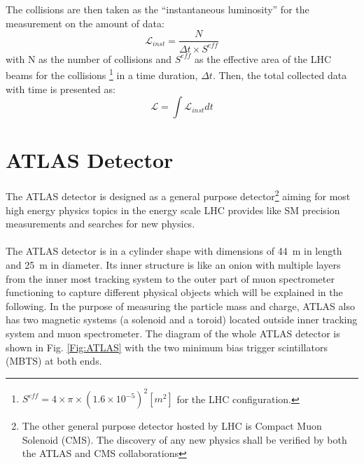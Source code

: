 \\
\\The collisions are then taken as the ``instantaneous luminosity'' for the measurement on the amount of data:
\begin{equation}
\mathcal{L}_{inst} = \frac{N}{\Delta t\times S^{eff}}
\end{equation}
with N as the number of collisions and $S^{eff}$ as the effective area of the LHC beams for the collisions \footnote{$S^{eff}=4\times\pi\times(1.6\times 10^{-5})^2[m^2]$ for the LHC configuration.} in a time duration, $\Delta t$. Then, the total collected data with time is presented as:
\begin{equation}
\mathcal{L} = \int \mathcal{L}_{inst}dt
\end{equation} 
\section{ATLAS Detector}
The ATLAS detector  \cite{atlastdr} is designed as a general purpose detector\footnote{The other general purpose detector hosted by LHC is Compact Muon Solenoid (CMS). The discovery of any new physics shall be verified by both the ATLAS and CMS collaborations} aiming for most high energy physics topics in the energy scale LHC provides like SM precision measurements and searches for new physics.
\\
\\The ATLAS detector is in a cylinder shape with dimensions of 44~m in length and 25~m in diameter. Its inner structure is like an onion with multiple layers from the inner most tracking system to the outer part of muon spectrometer functioning to capture different physical objects which will be explained in the following. In the purpose of measuring the particle mass and charge, ATLAS also has two magnetic systems (a solenoid and a toroid) located outside inner tracking system and muon spectrometer. The diagram of the whole ATLAS detector is shown in Fig. \ref{Fig:ATLAS} with the two minimum bias trigger scintillators (MBTS) at both ends.

